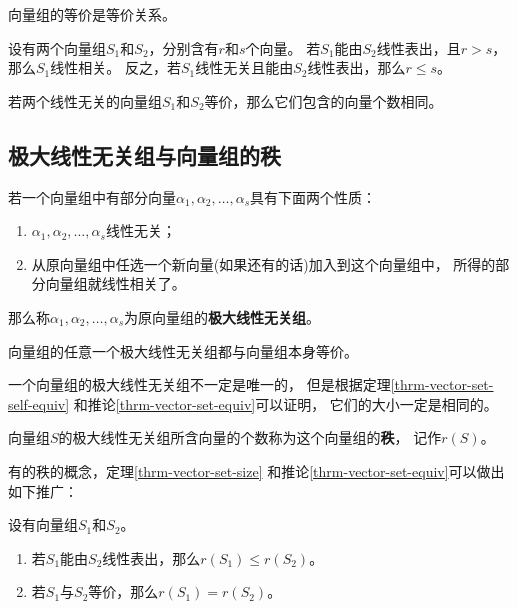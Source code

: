 \begin{remark}
  向量组的等价是等价关系。
\end{remark}

\begin{theorem} \label{thrm-vector-set-size}
  设有两个向量组$S_1$和$S_2$，分别含有$r$和$s$个向量。
  若$S_1$能由$S_2$线性表出，且$r > s$，那么$S_1$线性相关。
  反之，若$S_1$线性无关且能由$S_2$线性表出，那么$r \le s$。
\end{theorem}

\begin{corollary} \label{thrm-vector-set-equiv}
  若两个线性无关的向量组$S_1$和$S_2$等价，那么它们包含的向量个数相同。
\end{corollary}

\subsection{极大线性无关组与向量组的秩}
\begin{definition}
  若一个向量组中有部分向量$\alpha_1,\alpha_2,\dots,\alpha_s$具有下面两个性质：
  \begin{enumerate}
    \item
    $\alpha_1,\alpha_2,\dots,\alpha_s$线性无关；
    \item
    从原向量组中任选一个新向量(如果还有的话)加入到这个向量组中，
    所得的部分向量组就线性相关了。
  \end{enumerate}
  那么称$\alpha_1,\alpha_2,\dots,\alpha_s$为原向量组的\textbf{极大线性无关组}。
\end{definition}

\begin{theorem} \label{thrm-vector-set-self-equiv}
   向量组的任意一个极大线性无关组都与向量组本身等价。
\end{theorem}

\begin{remark}
  一个向量组的极大线性无关组不一定是唯一的，
  但是根据定理\ref{thrm-vector-set-self-equiv}
  和推论\ref{thrm-vector-set-equiv}可以证明，
  它们的大小一定是相同的。
\end{remark}

\begin{definition}[向量组的秩]
  向量组$S$的极大线性无关组所含向量的个数称为这个向量组的\textbf{秩}，
  记作$r(S)$。
\end{definition}

有的秩的概念，定理\ref{thrm-vector-set-size}
和推论\ref{thrm-vector-set-equiv}可以做出如下推广：
\begin{theorem}
  设有向量组$S_1$和$S_2$。
  \begin{enumerate}
    \item
    若$S_1$能由$S_2$线性表出，那么$r(S_1) \le r(S_2)$。
    \item
    若$S_1$与$S_2$等价，那么$r(S_1)=r(S_2)$。
  \end{enumerate}
\end{theorem}

